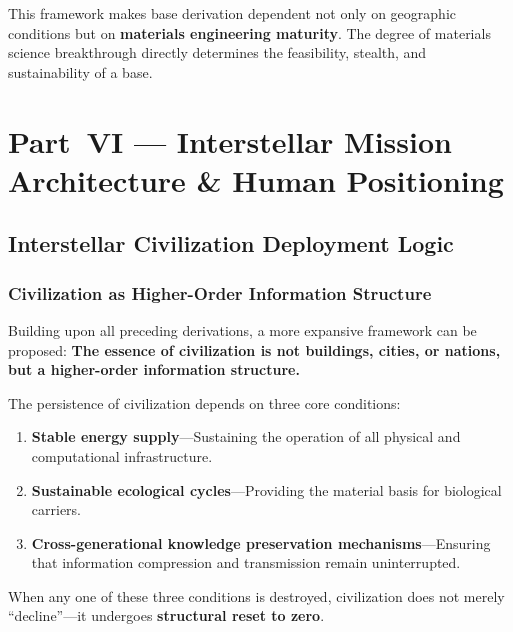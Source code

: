 \documentclass[aps,prd,twocolumn,superscriptaddress,nofootinbib]{revtex4-2}
\begin{document}
This framework makes base derivation dependent not only on geographic conditions but on \textbf{materials engineering maturity}. The degree of materials science breakthrough directly determines the feasibility, stealth, and sustainability of a base.


\section{Part~VI --- Interstellar Mission Architecture \& Human Positioning}\label{sec:part6}

\subsection{Interstellar Civilization Deployment Logic}\label{sec:deployment-logic}

\subsubsection{Civilization as Higher-Order Information Structure}\label{sec:info-structure}

Building upon all preceding derivations, a more expansive framework can be proposed: \textbf{The essence of civilization is not buildings, cities, or nations, but a higher-order information structure.}

The persistence of civilization depends on three core conditions:

\begin{enumerate}
  \item \textbf{Stable energy supply}---Sustaining the operation of all physical and computational infrastructure.
  \item \textbf{Sustainable ecological cycles}---Providing the material basis for biological carriers.
  \item \textbf{Cross-generational knowledge preservation mechanisms}---Ensuring that information compression and transmission remain uninterrupted.
\end{enumerate}

When any one of these three conditions is destroyed, civilization does not merely ``decline''---it undergoes \textbf{structural reset to zero}.
\end{document}
